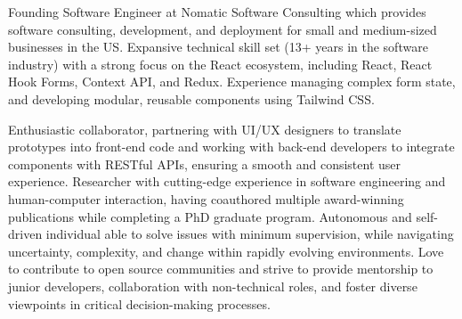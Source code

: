 

\begin{cvparagraph}

Founding Software Engineer at Nomatic Software Consulting which provides software consulting, development, and deployment for small and medium-sized businesses in the US.
Expansive technical skill set (13+ years in the software industry) with a strong focus on the React ecosystem, including React, React Hook Forms, Context API, and Redux.
Experience managing complex form state, and developing modular, reusable components using Tailwind CSS.

Enthusiastic collaborator, partnering with UI/UX designers to translate prototypes into front-end code and working with back-end developers to integrate components with RESTful APIs, ensuring a smooth and consistent user experience.
Researcher with cutting-edge experience in software engineering and human-computer interaction, having coauthored multiple award-winning publications while completing a PhD graduate program.
Autonomous and self-driven individual able to solve issues with minimum supervision, while navigating uncertainty, complexity, and change within rapidly evolving environments.
Love to contribute to open source communities and strive to provide mentorship to junior developers, collaboration with non-technical roles, and foster diverse viewpoints in critical decision-making processes.
\end{cvparagraph}

